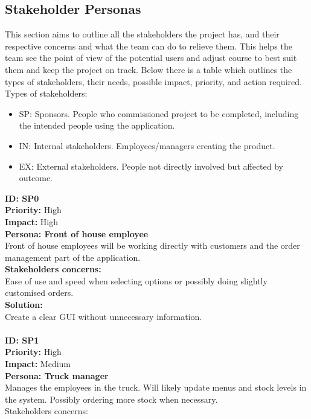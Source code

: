 
\subsection{Stakeholder Personas}
This section aims to outline all the stakeholders the project has, and their respective concerns and what the team can do to relieve them. This helps the team see the point of view of the potential users and adjust course to best suit them and keep the project on track. Below there is a table which outlines the types of stakeholders, their needs, possible impact, priority, and action required. \\
Types of stakeholders: \\
\begin{itemize}
	\item SP: Sponsors. People who commissioned project to be completed, including the intended people using the application. 
	\item IN: Internal stakeholders. Employees/managers creating the product. 
	\item EX: External stakeholders. People not directly involved but affected by outcome.\\
\end{itemize}
\textbf{ID: SP0\\}
\textbf{Priority:} High\\
\textbf{Impact:} High\\
\textbf{Persona: Front of house employee\\}
Front of house employees will be working directly with customers and the order management part of the application.\\
\textbf{Stakeholders concerns: \\}
Ease of use and speed when selecting options or possibly doing slightly customised orders.\\
\textbf{Solution:\\}
Create a clear GUI without unnecessary information.\\
\\
\textbf{ID: SP1\\}
\textbf{Priority:} High\\
\textbf{Impact:} Medium\\
\textbf{Persona: Truck manager\\}
Manages the employees in the truck. Will likely update menus and stock levels in the system. Possibly ordering more stock when necessary.\\
Stakeholders concerns:\\
